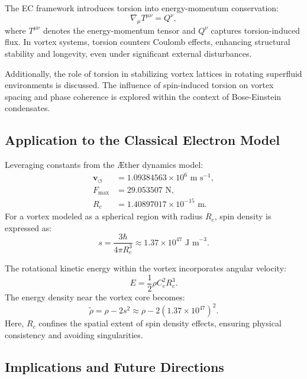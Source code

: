 The EC framework introduces torsion into energy-momentum conservation:
\begin{equation*}
\nabla_{\mu} T^{\mu\nu} = Q^{\nu},
\end{equation*}
where $T^{\mu\nu}$ denotes the energy-momentum tensor and $Q^{\nu}$ captures torsion-induced flux. In vortex systems, torsion counters Coulomb effects, enhancing structural stability and longevity, even under significant external disturbances.


Additionally, the role of torsion in stabilizing vortex lattices in rotating superfluid environments is discussed. The influence of spin-induced torsion on vortex spacing and phase coherence is explored within the context of Bose-Einstein condensates.


\subsection*{Application to the Classical Electron Model}


Leveraging constants from the Æther dynamics model:
\begin{align}
\mathbf{v}_{\scriptscriptstyle\boldsymbol{\circlearrowleft}} &= 1.09384563 \times 10^6 \text{ m s}^{-1}, \\
F_{\max} &= 29.053507 \text{ N}, \\
R_c &= 1.40897017 \times 10^{-15} \text{ m}.
\end{align}
For a vortex modeled as a spherical region with radius $R_c$, spin density is expressed as:
\begin{equation*}
s = \frac{3\hbar}{4\pi R_c^3} \approx 1.37 \times 10^{47} \text{ J m}^{-3}.
\end{equation*}


The rotational kinetic energy within the vortex incorporates angular velocity:
\begin{equation*}
E = \frac{1}{2} \rho C_e^2 R_c^3.
\end{equation*}
The energy density near the vortex core becomes:
\begin{equation*}
\tilde{\rho} = \rho - 2s^2 \approx \rho - 2(1.37 \times 10^{47})^2.
\end{equation*}
Here, $R_c$ confines the spatial extent of spin density effects, ensuring physical consistency and avoiding singularities.


\subsection*{Implications and Future Directions}


